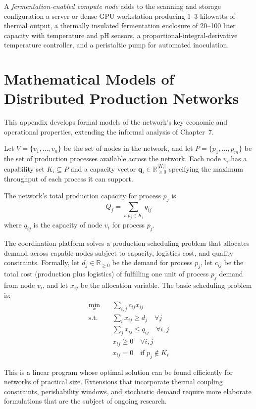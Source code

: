 \documentclass[12pt]{book}
\theoremstyle{definition}
\theoremstyle{remark}
\begin{document}
A \emph{fermentation-enabled compute node} adds to the scanning
and storage configuration a server or dense GPU workstation
producing 1--3 kilowatts of thermal output, a thermally insulated
fermentation enclosure of 20--100 liter capacity with temperature
and pH sensors, a proportional-integral-derivative temperature
controller, and a peristaltic pump for automated inoculation.

\chapter{Mathematical Models of Distributed Production Networks}

This appendix develops formal models of the network's key economic
and operational properties, extending the informal analysis of
Chapter~7.

Let $V = \{v_1, \ldots, v_n\}$ be the set of nodes in the network,
and let $P = \{p_1, \ldots, p_m\}$ be the set of production
processes available across the network. Each node $v_i$ has a
capability set $K_i \subseteq P$ and a capacity vector
$\mathbf{q}_i \in \mathbb{R}_{\geq 0}^{|K_i|}$ specifying the
maximum throughput of each process it can support.

The network's total production capacity for process $p_j$ is
\[
Q_j = \sum_{i : p_j \in K_i} q_{ij}
\]
where $q_{ij}$ is the capacity of node $v_i$ for process $p_j$.

The coordination platform solves a production scheduling problem
that allocates demand across capable nodes subject to capacity,
logistics cost, and quality constraints. Formally, let
$d_j \in \mathbb{R}_{\geq 0}$ be the demand for process $p_j$,
let $c_{ij}$ be the total cost (production plus logistics) of
fulfilling one unit of process $p_j$ demand from node $v_i$, and
let $x_{ij}$ be the allocation variable. The basic scheduling
problem is:
\begin{align}
\min_{x} \quad & \sum_{i,j} c_{ij} x_{ij} \\
\text{s.t.} \quad & \sum_i x_{ij} \geq d_j \quad \forall j \\
             & \sum_j x_{ij} \leq q_{ij} \quad \forall i, j \\
             & x_{ij} \geq 0 \quad \forall i, j \\
             & x_{ij} = 0 \quad \text{if } p_j \notin K_i
\end{align}

This is a linear program whose optimal solution can be found
efficiently for networks of practical size. Extensions that
incorporate thermal coupling constraints, perishability windows,
and stochastic demand require more elaborate formulations that
are the subject of ongoing research.
\end{document}
